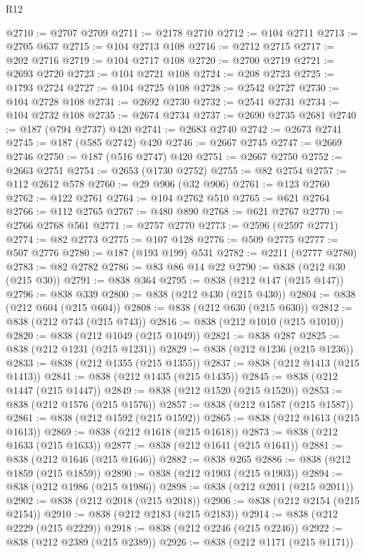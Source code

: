 \begin{lexlean}{R12}
\begin{coremodule}
@2710 := @2707 @2709
@2711 := @2178 @2710
@2712 := @104 @2711
@2713 := @2705 @637
@2715 := @104 @2713 @108
@2716 := @2712 @2715
@2717 := @202 @2716
@2719 := @104 @2717 @108
@2720 := @2700 @2719
@2721 := @2693 @2720
@2723 := @104 @2721 @108
@2724 := @208 @2723
@2725 := @1793 @2724
@2727 := @104 @2725 @108
@2728 := @2542 @2727
@2730 := @104 @2728 @108
@2731 := @2692 @2730
@2732 := @2541 @2731
@2734 := @104 @2732 @108
@2735 := @2674 @2734
@2737 := @2690 @2735 @2681
@2740 := @187 (@794 @2737) @420
@2741 := @2683 @2740
@2742 := @2673 @2741
@2745 := @187 (@585 @2742) @420
@2746 := @2667 @2745
@2747 := @2669 @2746
@2750 := @187 (@516 @2747) @420
@2751 := @2667 @2750
@2752 := @2663 @2751
@2754 := @2653 (@1730 @2752)
@2755 := @82 @2754
@2757 := @112 @2612 @578
@2760 := @29 @906 (@32 @906)
@2761 := @123 @2760
@2762 := @122 @2761
@2764 := @104 @2762 @510
@2765 := @621 @2764
@2766 := @112 @2765
@2767 := @480 @890
@2768 := @621 @2767
@2770 := @2766 @2768 @561
@2771 := @2757 @2770
@2773 := @2596 (@2597 @2771)
@2774 := @82 @2773
@2775 := @107 @128
@2776 := @509 @2775
@2777 := @507 @2776
@2780 := @187 (@193 @199) @531
@2782 := @2211 (@2777 @2780)
@2783 := @82 @2782
@2786 := @83 @86 @14 @22
@2790 := @838 (@212 @30 (@215 @30))
@2791 := @838 @364
@2795 := @838 (@212 @147 (@215 @147))
@2796 := @838 @339
@2800 := @838 (@212 @430 (@215 @430))
@2804 := @838 (@212 @604 (@215 @604))
@2808 := @838 (@212 @630 (@215 @630))
@2812 := @838 (@212 @743 (@215 @743))
@2816 := @838 (@212 @1010 (@215 @1010))
@2820 := @838 (@212 @1049 (@215 @1049))
@2821 := @838 @287
@2825 := @838 (@212 @1231 (@215 @1231))
@2829 := @838 (@212 @1236 (@215 @1236))
@2833 := @838 (@212 @1355 (@215 @1355))
@2837 := @838 (@212 @1413 (@215 @1413))
@2841 := @838 (@212 @1435 (@215 @1435))
@2845 := @838 (@212 @1447 (@215 @1447))
@2849 := @838 (@212 @1520 (@215 @1520))
@2853 := @838 (@212 @1576 (@215 @1576))
@2857 := @838 (@212 @1587 (@215 @1587))
@2861 := @838 (@212 @1592 (@215 @1592))
@2865 := @838 (@212 @1613 (@215 @1613))
@2869 := @838 (@212 @1618 (@215 @1618))
@2873 := @838 (@212 @1633 (@215 @1633))
@2877 := @838 (@212 @1641 (@215 @1641))
@2881 := @838 (@212 @1646 (@215 @1646))
@2882 := @838 @265
@2886 := @838 (@212 @1859 (@215 @1859))
@2890 := @838 (@212 @1903 (@215 @1903))
@2894 := @838 (@212 @1986 (@215 @1986))
@2898 := @838 (@212 @2011 (@215 @2011))
@2902 := @838 (@212 @2018 (@215 @2018))
@2906 := @838 (@212 @2154 (@215 @2154))
@2910 := @838 (@212 @2183 (@215 @2183))
@2914 := @838 (@212 @2229 (@215 @2229))
@2918 := @838 (@212 @2246 (@215 @2246))
@2922 := @838 (@212 @2389 (@215 @2389))
@2926 := @838 (@212 @1171 (@215 @1171))

\end{coremodule}
\end{lexlean}
